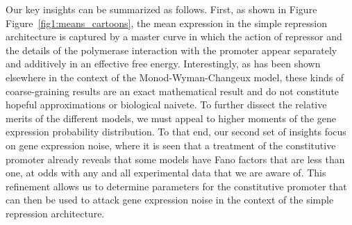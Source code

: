 Our key insights can be summarized as follows.  First, as shown in Figure
Figure~\ref{fig1:means_cartoons}, the mean expression in the
simple repression architecture is captured by a master curve
in which the action of repressor and the details of the polymerase
interaction with the promoter appear separately and additively
in an effective free energy.  Interestingly, as has been shown
elsewhere in the context of the Monod-Wyman-Changeux model,
these kinds of coarse-graining results are an exact mathematical
result and do not constitute hopeful approximations or biological
naivete.  To further dissect the relative merits of the different models,
we must appeal to higher moments of the gene expression probability
distribution.  To that end, our second set of insights focus on gene
expression noise, where it is seen that a treatment of
the constitutive promoter already reveals that some models have Fano
factors that are less than one, at odds with any and all experimental
data that we are aware of.   This refinement allows us to determine
parameters for the constitutive promoter that can then be used
to attack gene expression noise in the context of
the simple repression architecture.





